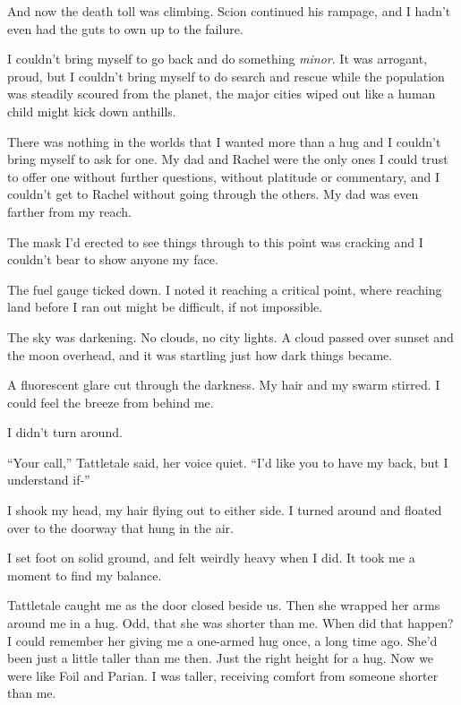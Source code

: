 And now the death toll was climbing.  Scion continued his rampage, and I hadn't even had the guts to own up to the failure.



I couldn't bring myself to go back and do something \emph{minor}.  It was arrogant, proud, but I couldn't bring myself to do search and rescue while the population was steadily scoured from the planet, the major cities wiped out like a human child might kick down anthills.



There was nothing in the worlds that I wanted more than a hug and I couldn't bring myself to ask for one.  My dad and Rachel were the only ones I could trust to offer one without further questions, without platitude or commentary, and I couldn't get to Rachel without going through the others.  My dad was even farther from my reach.



The mask I'd erected to see things through to this point was cracking and I couldn't bear to show anyone my face.



The fuel gauge ticked down.  I noted it reaching a critical point, where reaching land before I ran out might be difficult, if not impossible.



The sky was darkening.  No clouds, no city lights.  A cloud passed over sunset and the moon overhead, and it was startling just how dark things became.



A fluorescent glare cut through the darkness.  My hair and my swarm stirred.  I could feel the breeze from behind me.



I didn't turn around.



``Your call,'' Tattletale said, her voice quiet.  ``I'd like you to have my back, but I understand if-''



I shook my head, my hair flying out to either side.  I turned around and floated over to the doorway that hung in the air.



I set foot on solid ground, and felt weirdly heavy when I did.  It took me a moment to find my balance.



Tattletale caught me as the door closed beside us.  Then she wrapped her arms around me in a hug.  Odd, that she was shorter than me.  When did that happen?  I could remember her giving me a one-armed hug once, a long time ago.  She'd been just a little taller than me then.  Just the right height for a hug.  Now we were like Foil and Parian.  I was taller, receiving comfort from someone shorter than me.



